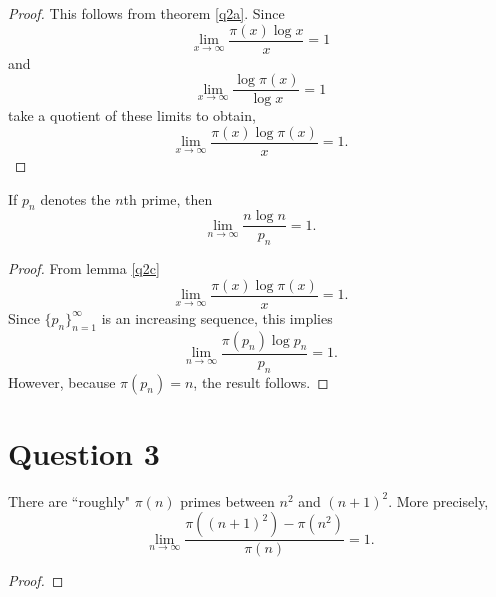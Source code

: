\documentclass{unswmaths}
\begin{document}
    \begin{proof}
        This follows from theorem \ref{q2a}. Since
        \begin{equation*}
            \lim_{x\rightarrow\infty} \frac{\pi(x)\log{x}}{x} = 1
        \end{equation*}
        and
        \begin{equation*}
            \lim_{x\rightarrow\infty} \frac{\log{\pi(x)}}{\log{x}} = 1
        \end{equation*}
        take a quotient of these limits to obtain,
        \begin{equation*}
            \lim_{x\rightarrow\infty} \frac{\pi(x)\log{\pi(x)}}{x} = 1.
        \end{equation*}
    \end{proof}
    \begin{theorem}
        If $p_n$ denotes the $n$th prime, then
        \begin{equation*}   
            \lim_{n\rightarrow\infty} \frac{n\log{n}}{p_n} = 1.
        \end{equation*}
    \end{theorem}
    \begin{proof}
        From lemma \ref{q2c} 
        \begin{equation*}
            \lim_{x\rightarrow\infty} \frac{\pi(x)\log{\pi(x)}}{x} = 1.
        \end{equation*}
        Since $\{p_n\}_{n=1}^\infty$ is an increasing sequence, this implies
        \begin{equation*}
            \lim_{n\rightarrow\infty} \frac{\pi(p_n)\log{p_n}}{p_n} = 1.
        \end{equation*}
        However, because $\pi(p_n) = n$, the result follows.
    \end{proof}
\section*{Question 3}
    \begin{theorem}
        There are ``roughly" $\pi(n)$ primes between $n^2$ and $(n+1)^2$. More precisely,
        \begin{equation*}
            \lim_{n\rightarrow\infty} \frac{\pi((n+1)^2)-\pi(n^2)}{\pi(n)} = 1.
        \end{equation*}
    \end{theorem}
    \begin{proof}
        
        
    \end{proof}
        
\end{document}

